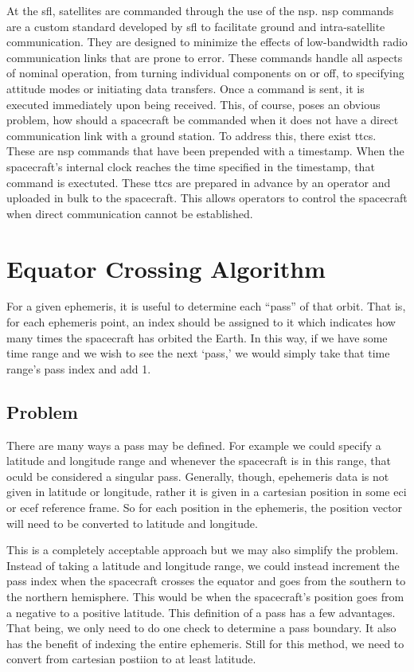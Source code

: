 At the \gls{sfl}, satellites are commanded through the use of the \gls{nsp}.
\gls{nsp} commands are a custom standard developed by \gls{sfl} to facilitate
ground and intra-satellite communication. They are designed to minimize the
effects of low-bandwidth radio communication links that are prone to error.
These commands handle all aspects of nominal operation, from turning individual
components on or off, to specifying attitude modes or initiating data
transfers. Once a command is sent, it is executed immediately upon being
received. This, of course, poses an obvious problem, how should a spacecraft be
commanded when it does not have a direct communication link with a ground
station. To address this, there exist \glspl{ttc}. These are \gls{nsp} commands
that have been prepended with a timestamp. When the spacecraft's internal clock
reaches the time specified in the timestamp, that command is exectuted. These
\glspl{ttc} are prepared in advance by an operator and uploaded in bulk to the
spacecraft. This allows operators to control the spacecraft when direct
communication cannot be established.



\section{Equator Crossing Algorithm}

For a given ephemeris, it is useful to determine each ``pass'' of that orbit.
That is, for each ephemeris point, an index should be assigned to it which
indicates how many times the spacecraft has orbited the Earth. In this way, if
we have some time range and we wish to see the next `pass,' we would simply
take that time range's pass index and add 1.

\subsection{Problem}

There are many ways a pass may be defined. For example we could specify a
latitude and longitude range and whenever the spacecraft is in this range, that
oculd be considered a singular pass.  Generally, though, epehemeris data is not
given in latitude or longitude, rather it is given in a cartesian position in
some \gls{eci} or \gls{ecef} reference frame.  So for each position in the
ephemeris, the position vector will need to be converted to latitude and
longitude. 

This is a completely acceptable approach but we may also simplify the problem.
Instead of taking a latitude and longitude range, we could instead increment
the pass index when the spacecraft crosses the equator and goes from the
southern to the northern hemisphere. This would be when the spacecraft's
position goes from a negative to a positive latitude. This definition of a pass
has a few advantages. That being, we only need to do one check to determine a
pass boundary. It also has the benefit of indexing the entire ephemeris. Still
for this method, we need to convert from cartesian postiion to at least
latitude.

